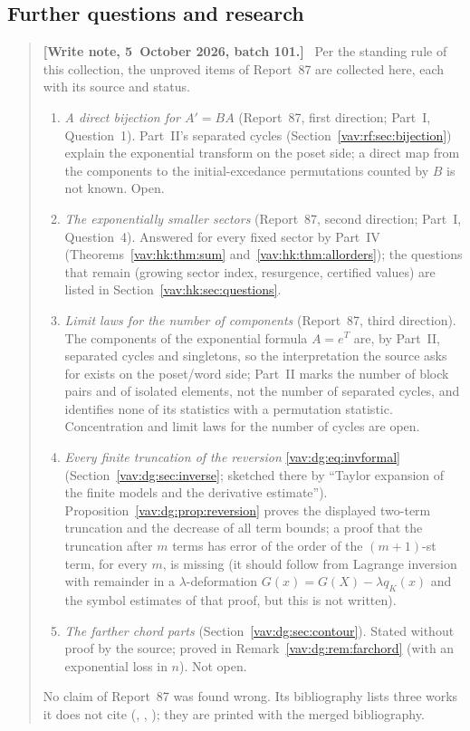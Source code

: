 \documentclass[11pt]{article}
\theoremstyle{remark}\newtheorem{remark}[theorem]{Remark}
\newenvironment{writenoteb}{\begin{quote}\small\raggedright\textbf{[Write note, 5~October 2026, batch 101.]}\ }{\end{quote}}
\begin{document}
\subsection{Further questions and research}\label{vav:dg:sec:questions}
\begin{writenoteb}
Per the standing rule of this collection, the unproved items of Report~87
are collected here, each with its source and status.
\begin{enumerate}
\item \emph{A direct bijection for $A'=BA$} (Report~87, first direction;
Part~I, Question~1). Part~II's separated cycles
(Section~\ref{vav:rf:sec:bijection}) explain the exponential transform on
the poset side; a direct map from the components to the initial-excedance
permutations counted by $B$ is not known. Open.
\item \emph{The exponentially smaller sectors} (Report~87, second direction;
Part~I, Question~4). Answered for every fixed sector by Part~IV
(Theorems~\ref{vav:hk:thm:sum} and~\ref{vav:hk:thm:allorders}); the
questions that remain (growing sector index, resurgence, certified values)
are listed in Section~\ref{vav:hk:sec:questions}.
\item \emph{Limit laws for the number of components} (Report~87, third
direction). The components of the exponential formula $A=e^T$ are, by
Part~II, separated cycles and singletons, so the interpretation the source
asks for exists on the poset/word side; Part~II marks the number of block
pairs and of isolated elements, not the number of separated cycles, and
identifies none of its statistics with a permutation statistic. Concentration
and limit laws for the number of cycles are open.
\item \emph{Every finite truncation of the reversion}
\eqref{vav:dg:eq:invformal} (Section~\ref{vav:dg:sec:inverse}; sketched
there by ``Taylor expansion of the finite models and the derivative
estimate''). Proposition~\ref{vav:dg:prop:reversion} proves the displayed
two-term truncation and the decrease of all term bounds; a proof that the
truncation after $m$ terms has error of the order of the $(m+1)$-st term,
for every $m$, is missing (it should follow from Lagrange inversion with
remainder in a $\lambda$-deformation $G(x)=G(X)-\lambda q_K(x)$ and the
symbol estimates of that proof, but this is not written).
\item \emph{The farther chord parts} (Section~\ref{vav:dg:sec:contour}).
Stated without proof by the source; proved in
Remark~\ref{vav:dg:rem:farchord} (with an exponential loss in $n$). Not open.
\end{enumerate}
No claim of Report~87 was found wrong. Its bibliography lists three works it
does not cite (\cite{clark}, \cite{fs}, \cite{proveitdg}); they are printed
with the merged bibliography.
\end{writenoteb}
\end{document}
